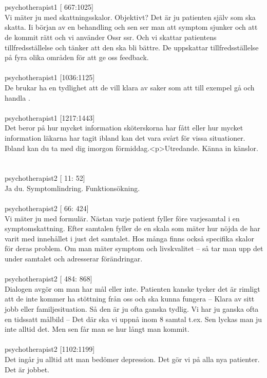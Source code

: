 \documentclass[12pt,a4paper,oneside]{article}
\begin{document}
\ \\\ \\
 psychotherapist1 [ 667:1025]\\ 
Vi m{\"a}ter ju med skattningsskalor. Objektivt? Det {\"a}r ju patienten sj{\"a}lv som ska skatta. Ii b{\"o}rjan av en behandling och sen ser man att symptom sjunker och att de kommit r{\"a}tt och vi anv{\"a}nder Ossr ssr. Och vi skattar patientens tillfredsst{\"a}llelse och t{\"a}nker att den ska bli b{\"a}ttre. De uppskattar tillfredsst{\"a}llelse p{\aa} fyra olika omr{\aa}den f{\"o}r att ge oss feedback. %
\ \\\ \\
 psychotherapist1 [1036:1125]\\ 
De brukar ha en tydlighet att de vill klara av saker som att till exempel g{\aa} och handla . %
\ \\\ \\
 psychotherapist1 [1217:1443]\\ 
Det beror p{\aa} hur mycket information sk{\"o}terskorna har f{\aa}tt eller hur mycket information l{\"a}karna har tagit ibland kan det vara sv{\aa}rt f{\"o}r vissa situationer. Ibland kan du ta med dig imorgon f{\"o}rmiddag.<p>Utredande. K{\"a}nna in k{\"a}nslor. %
\ \\\ \\
 psychotherapist2 [  11:  52]\\ 
Ja du. Symptomlindring. Funktions{\"o}kning.  %
\ \\\ \\
 psychotherapist2 [  66: 424]\\ 
Vi m{\"a}ter ju med formul{\"a}r. N{\"a}stan varje patient fyller f{\"o}re varjesamtal i en symptomskattning. Efter samtalen fyller de en skala som m{\"a}ter hur n{\"o}jda de har varit med inneh{\aa}llet i just det samtalet. Hos m{\aa}nga finns ocks{\aa} specifika skalor f{\"o}r deras problem. Om man m{\"a}ter symptom och livskvalitet -- s{\aa} tar man upp det under samtalet och adresserar f{\"o}r{\"a}ndringar. %
\ \\\ \\
 psychotherapist2 [ 484: 868]\\ 
Dialogen avg{\"o}r om man har m{\aa}l eller inte. Patienten kanske tycker det {\"a}r rimligt att de inte kommer ha st{\"o}ttning fr{\aa}n oss och ska kunna fungera -- Klara av sitt jobb eller familjesituation. S{\aa} den {\"a}r ju ofta ganska tydlig. Vi har ju ganska ofta en tidssatt m{\aa}lbild -- Det d{\"a}r ska vi uppn{\aa} inom 8 samtal t.ex. Sen lyckas man ju inte alltid det. Men sen f{\aa}r man se hur l{\aa}ngt man kommit. %
\ \\\ \\
 psychotherapist2 [1102:1199]\\ 
Det ing{\aa}r ju alltid att man bed{\"o}mer depression. Det g{\"o}r vi p{\aa} alla nya patienter. Det {\"a}r jobbet.  %
\end{document}
